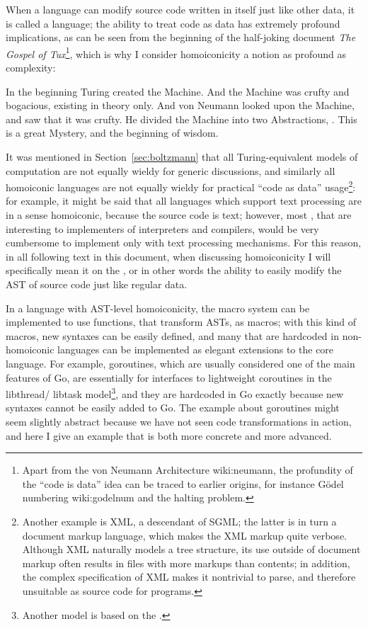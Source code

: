 When a language can modify source code written in itself just like other
data, it is called a  language;
the ability to treat code as data has extremely profound implications,
as can be seen from the beginning of the half-joking document \emph{The
Gospel of Tux}\footnote{Apart from the von Neumann Architecture\cupercite%
{wiki:neumann}, the profundity of the ``code is data'' idea can be
traced to earlier origins, for instance Gödel numbering\cupercite%
{wiki:godelnum} and the halting problem.}, which
is why I consider homoiconicity a notion as profound as complexity:
\begin{quoting}
	In the beginning Turing created the Machine.  And the Machine was crufty
	and bogacious, existing in theory only.  And von Neumann looked upon
	the Machine, and saw that it was crufty.  He divided the Machine into
	two Abstractions, .  This is a great Mystery, and the beginning of wisdom.
\end{quoting}
It was mentioned in Section~\ref{sec:boltzmann} that all Turing-equivalent
models of computation are not equally wieldy for generic discussions, and
similarly all homoiconic languages are not equally wieldy for practical ``code
as data'' usage\footnote{Another example is XML, a descendant of SGML; the
latter is in turn a document markup language, which makes the XML markup quite
verbose.  Although XML naturally models a tree structure, its use outside of
document markup often results in files with more markups than contents; in
addition, the complex specification of XML makes it nontrivial to parse, and
therefore unsuitable as source code for programs.}: for example, it might be
said that all languages which support text processing are in a sense homoiconic,
because the source code is text; however, most ,
that are interesting to implementers of interpreters and compilers, would be
very cumbersome to implement only with text processing mechanisms.  For this
reason, in all following text in this document, when discussing homoiconicity
I will specifically mean it on the , or in other words
the ability to easily modify the AST of source code just like regular data.

In a language with AST-level homoiconicity, the macro system can be implemented
to use functions, that transform ASTs, as macros; with this kind of macros, new
syntaxes can be easily defined, and many  that are
hardcoded in non-homoiconic languages can be implemented as elegant extensions
to the core language.  For example, goroutines, which are usually considered
one of the main features of Go, are essentially  for
interfaces to lightweight coroutines in the libthread/%
libtask model\footnote{\label{fn:cps}Another model is
based on the .}, and
they are hardcoded in Go exactly because new syntaxes cannot be easily added
to Go.  The example about goroutines might seem slightly abstract because
we have not seen code transformations in action, and here I give
an example that is both more concrete and more advanced.

